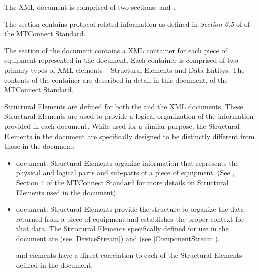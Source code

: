 The  \gls{XML} document is comprised of two sections:  and .

The  section contains protocol related information as defined in \textit{Section 6.5} of  of the MTConnect Standard.

The  section of the  document contains a \linebreak{} \gls{XML} container for each piece of equipment represented in the document.  Each  container is comprised of two primary types of \gls{XML} elements – \glspl{Structural Element} and \glspl{Data Entity}.  The contents of the  container are described in detail in this document,  of the MTConnect Standard.

\glspl{Structural Element} are defined for both the  and the  \gls{XML} documents.  These \glspl{Structural Element} are used to provide a logical organization of the information provided in each document.  While used for a similar purpose, the \glspl{Structural Element} in the  document are specifically designed to be distinctly different from those in the  document:  

\begin{itemize}

\item {} document: \glspl{Structural Element} organize information that represents the physical and logical parts and sub-parts of a piece of equipment.  (See , Section 4 of the MTConnect Standard for more details on \glspl{Structural Element} used in the  document).  

\item {} document: \glspl{Structural Element} provide the structure to organize the data returned from a piece of equipment and establishes the proper context for that data.  The \glspl{Structural Element} specifically defined for use in the  document are  (see \ref{DeviceStream}) and  (see \ref{ComponentStream}).   

 and  elements have a direct correlation to each of the \glspl{Structural Element} defined in the  document.
\end{itemize}

